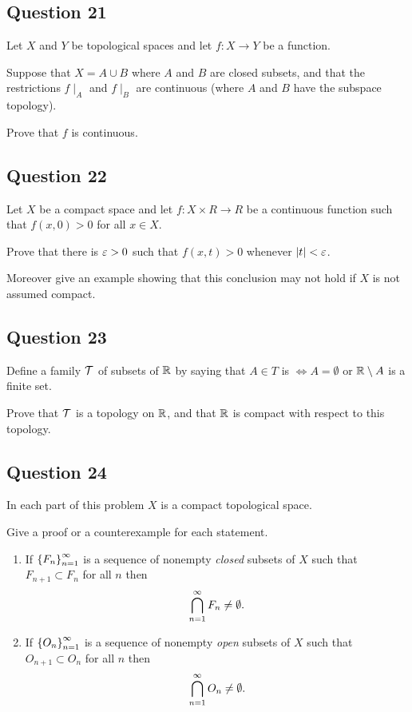 \documentclass[12pt]{article}
\begin{document}
\hypertarget{question-21-3}{%
\subsection{Question 21}\label{question-21-3}}

Let \(X\) and \(Y\) be topological spaces and let \(f : X \to Y\) be a
function.

Suppose that \(X = A \cup B\) where \(A\) and \(B\) are closed subsets,
and that the restrictions \(f \mid_A\) and \(f \mid_B\) are continuous
(where \(A\) and \(B\) have the subspace topology).

Prove that \(f\) is continuous.

\hypertarget{question-22-3}{%
\subsection{Question 22}\label{question-22-3}}

Let \(X\) be a compact space and let \(f : X \times R \to R\) be a
continuous function such that \(f (x, 0) > 0\) for all \(x \in X\).

Prove that there is \(\varepsilon > 0\) such that \(f (x, t) > 0\) whenever
\({\left\lvert {t} \right\rvert} < \varepsilon\).

Moreover give an example showing that this conclusion may not hold if
\(X\) is not assumed compact.

\hypertarget{question-23-3}{%
\subsection{Question 23}\label{question-23-3}}

Define a family \({\mathcal{T}}\) of subsets of \({\mathbb{R}}\) by saying that
\(A \in T\) is \(\iff A = \emptyset\) or \({\mathbb{R}} \setminus A\) is a finite
set.

Prove that \({\mathcal{T}}\) is a topology on \({\mathbb{R}}\), and that \({\mathbb{R}}\) is
compact with respect to this topology.

\hypertarget{question-24-3}{%
\subsection{Question 24}\label{question-24-3}}

In each part of this problem \(X\) is a compact topological space.

Give a proof or a counterexample for each statement.

\begin{enumerate}
\def\labelenumi{\alph{enumi}.}
\item
  If \(\left\{{F_n }\right\}_{n=1}^\infty\) is a sequence of nonempty
  \emph{closed} subsets of \(X\) such that \(F_{n+1} \subset F_{n}\) for
  all \(n\) then \[\bigcap^\infty_{n=1} F_n\neq \emptyset.\]
\item
  If \(\left\{{O_n}\right\}_{n=1}^\infty\) is a sequence of nonempty \emph{open}
  subsets of \(X\) such that \(O_{n+1} \subset O_n\) for all \(n\) then
  \[\bigcap_{n=1}^\infty O_{n}\neq \emptyset.\]
\end{enumerate}
\end{document}
